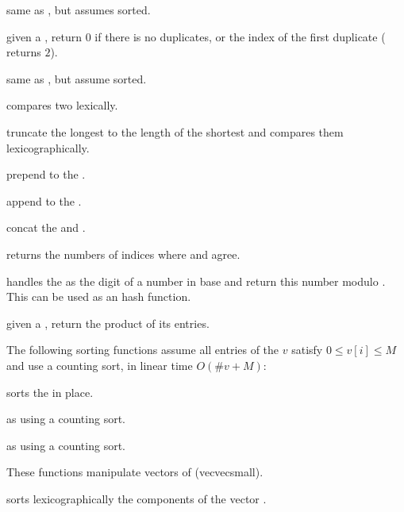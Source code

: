  same as , but assumes
  sorted.

 given a  , return
$0$ if there is no duplicates, or the index of the first duplicate
( returns $2$).

 same as
, but assume  sorted.

 compares two  lexically.

 truncate the longest 
to the length of the shortest and compares them lexicographically.

 prepend  to the
 .

 append  to the
 .

 concat the  
and .

 returns the numbers of indices
where  and  agree.

 handles the
  as the digit of a number in base  and return
this number modulo . This can be used as an hash function.

 given a  , return
the product of its entries.

The following sorting functions assume all entries of the 
$v$ satisfy $0 \leq v[i] \leq M$ and use a counting sort, in linear time
$O(\#v + M)$:

 sorts the 
 in place.

 as
 using a counting sort.

 as
 using a counting sort.

These functions manipulate vectors of  (vecvecsmall).

 sorts lexicographically the components of
the vector .

